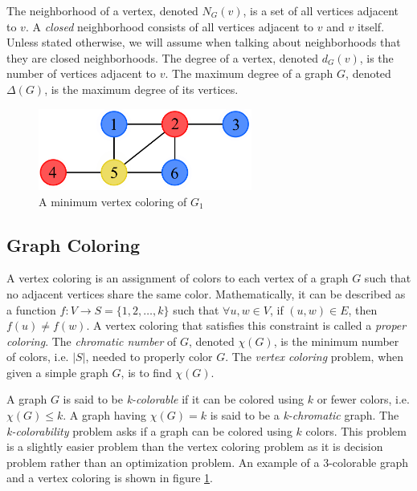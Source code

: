 \documentclass{sig-alternate}
\begin{document}
The neighborhood of a vertex, denoted $N_G(v)$, is a set of all vertices adjacent to $v$. A \emph{closed} neighborhood consists of all vertices adjacent to $v$ and $v$ itself. Unless stated otherwise, we will assume when talking about neighborhoods that they are closed neighborhoods. The degree of a vertex, denoted $d_G(v)$, is the number of vertices adjacent to $v$. The maximum degree of a graph $G$, denoted $\Delta(G)$, is the maximum degree of its vertices. \cite{bondy1976graph}

\begin{figure}[h]
	\centering
	\includegraphics[width=7cm]{../figures/example-vcp.pdf}
	\caption{A minimum vertex coloring of $G_1$}\label{fig:vcp-example}
\end{figure}


\subsection{Graph Coloring}
\label{sec:coloring}
A vertex coloring is an assignment of colors to each vertex of a graph $G$ such that no adjacent vertices share the same color. Mathematically, it can be described as a function $f : V \rightarrow S = \{1, 2, \dots, k\}$ such that $\forall u,w \in V$, if $(u,w) \in E$, then $f(u) \neq f(w)$. A vertex coloring that satisfies this constraint is called a \emph{proper coloring}. The \emph{chromatic number} of $G$, denoted $\chi(G)$, is the minimum number of colors, i.e. $|S|$, needed to properly color $G$. The \emph{vertex coloring} problem, when given a simple graph $G$, is to find $\chi(G)$. \cite{bondy1976graph}

A graph $G$ is said to be \emph{k-colorable} if it can be colored using $k$ or fewer colors, i.e. $\chi(G) \leq k$. A graph having $\chi(G) = k$ is said to be a \emph{k-chromatic} graph. The \emph{k-colorability} problem asks if a graph can be colored using $k$ colors. This problem is a slightly easier problem than the vertex coloring problem as it is decision problem rather than an optimization problem. An example of a 3-colorable graph and a vertex coloring is shown in figure \ref{fig:vcp-example}.
\end{document}
